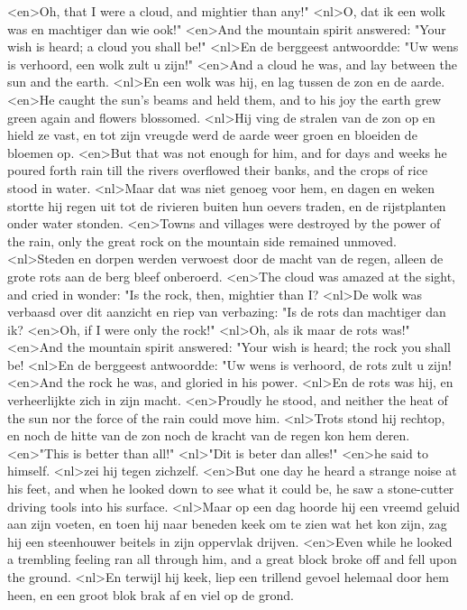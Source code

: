 <en>Oh, that I were a cloud, and mightier than any!"
<nl>O, dat ik een wolk was en machtiger dan wie ook!"
<en>And the mountain spirit answered: "Your wish is heard; a cloud you shall be!"
<nl>En de berggeest antwoordde: "Uw wens is verhoord, een wolk zult u zijn!"
<en>And a cloud he was, and lay between the sun and the earth.
<nl>En een wolk was hij, en lag tussen de zon en de aarde.
<en>He caught the sun's beams and held them, and to his joy the earth grew green again and flowers blossomed.
<nl>Hij ving de stralen van de zon op en hield ze vast, en tot zijn vreugde werd de aarde weer groen en bloeiden de bloemen op.
<en>But that was not enough for him, and for days and weeks he poured forth rain till the rivers overflowed their banks, and the crops of rice stood in water.
<nl>Maar dat was niet genoeg voor hem, en dagen en weken stortte hij regen uit tot de rivieren buiten hun oevers traden, en de rijstplanten onder water stonden.
<en>Towns and villages were destroyed by the power of the rain, only the great rock on the mountain side remained unmoved.
<nl>Steden en dorpen werden verwoest door de macht van de regen, alleen de grote rots aan de berg bleef onberoerd.
<en>The cloud was amazed at the sight, and cried in wonder: "Is the rock, then, mightier than I?
<nl>De wolk was verbaasd over dit aanzicht en riep van verbazing: "Is de rots dan machtiger dan ik?
<en>Oh, if I were only the rock!"
<nl>Oh, als ik maar de rots was!"
<en>And the mountain spirit answered: "Your wish is heard; the rock you shall be!
<nl>En de berggeest antwoordde: "Uw wens is verhoord, de rots zult u zijn!
<en>And the rock he was, and gloried in his power.
<nl>En de rots was hij, en verheerlijkte zich in zijn macht.
<en>Proudly he stood, and neither the heat of the sun nor the force of the rain could move him.
<nl>Trots stond hij rechtop, en  noch de hitte van de zon noch de kracht van de regen kon hem deren.
<en>"This is better than all!"
<nl>"Dit is beter dan alles!"
<en>he said to himself.
<nl>zei hij tegen zichzelf.
<en>But one day he heard a strange noise at his feet, and when he looked down to see what it could be, he saw a stone-cutter driving tools into his surface.
<nl>Maar op een dag hoorde hij een vreemd geluid aan zijn voeten, en toen hij naar beneden keek om te zien wat het kon zijn, zag hij een steenhouwer beitels in zijn oppervlak drijven.
<en>Even while he looked a trembling feeling ran all through him, and a great block broke off and fell upon the ground.
<nl>En terwijl hij keek, liep een trillend gevoel helemaal door hem heen, en een groot blok brak af en viel op de grond.
